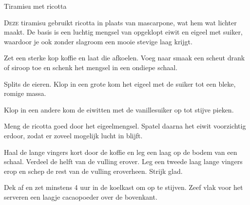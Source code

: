 \begin{recipe}{Tiramisu met ricotta}


\lettrine{D}{eze} tiramisu gebruikt ricotta in plaats van mascarpone, wat hem wat
lichter maakt. De basis is een luchtig mengsel van opgeklopt eiwit en eigeel met
suiker, waardoor je ook zonder slagroom een mooie stevige laag krijgt.

\begin{ingredients}
\end{ingredients}

\begin{steps}
  \item Zet een sterke kop koffie en laat die afkoelen. Voeg naar smaak een scheut
        drank of siroop toe en schenk het mengsel in een ondiepe schaal.
  \item Splits de eieren. Klop in een grote kom het eigeel met de suiker tot een
        bleke, romige massa.
  \item Klop in een andere kom de eiwitten met de vanillesuiker op tot stijve pieken.
  \item Meng de ricotta goed door het eigeelmengsel. Spatel daarna het eiwit
        voorzichtig erdoor, zodat er zoveel mogelijk lucht in blijft.
  \item Haal de lange vingers kort door de koffie en leg een laag op de bodem van een
        schaal. Verdeel de helft van de vulling erover. Leg een tweede laag lange
        vingers erop en schep de rest van de vulling eroverheen. Strijk glad.
  \item Dek af en zet minstens 4 uur in de koelkast om op te stijven. Zeef vlak voor
        het serveren een laagje cacaopoeder over de bovenkant.
\end{steps}
\end{recipe}
